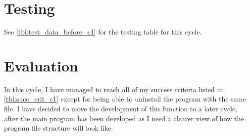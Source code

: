 \section{Testing}

    See \autoref{tbl:test_data_before_c1} for the testing table for this cycle.





\section{Evaluation}
    In this cycle, I have managed to reach all of my success criteria listed in \autoref{tbl:succ_crit_c1} except for being able to uninstall the program with the same file. 
    I have decided to move the development of this function to a later cycle, after the main program has been developed as I need a clearer view of how the program file structure will look like. 
